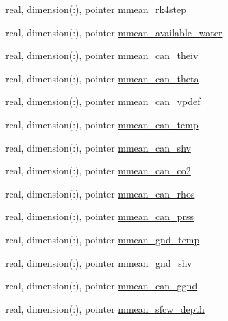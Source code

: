 \begin{DoxyCompactItemize}
\item 
real, dimension(\+:), pointer \hyperlink{structed__state__vars_1_1sitetype_a88b33141ab6bae2635ac1c1b04ba665d}{mmean\+\_\+rk4step}
\item 
real, dimension(\+:), pointer \hyperlink{structed__state__vars_1_1sitetype_a47f00c897787ef821e5ea31faf3558bf}{mmean\+\_\+available\+\_\+water}
\item 
real, dimension(\+:), pointer \hyperlink{structed__state__vars_1_1sitetype_a49199a78f099847a1e20b7688f785c0a}{mmean\+\_\+can\+\_\+theiv}
\item 
real, dimension(\+:), pointer \hyperlink{structed__state__vars_1_1sitetype_a5d27344c45b473150abbfaeda312c136}{mmean\+\_\+can\+\_\+theta}
\item 
real, dimension(\+:), pointer \hyperlink{structed__state__vars_1_1sitetype_a37181ec5e92d5e673eeccca0a0d5a1fe}{mmean\+\_\+can\+\_\+vpdef}
\item 
real, dimension(\+:), pointer \hyperlink{structed__state__vars_1_1sitetype_ae09588871695eb599013a6755dc76222}{mmean\+\_\+can\+\_\+temp}
\item 
real, dimension(\+:), pointer \hyperlink{structed__state__vars_1_1sitetype_a4ae91e06cdefd7814c0fe0f81be3abc9}{mmean\+\_\+can\+\_\+shv}
\item 
real, dimension(\+:), pointer \hyperlink{structed__state__vars_1_1sitetype_a4e4e75a5b4df5883cea8a60b971c1d67}{mmean\+\_\+can\+\_\+co2}
\item 
real, dimension(\+:), pointer \hyperlink{structed__state__vars_1_1sitetype_a004a28fe3261652b66512ad685618359}{mmean\+\_\+can\+\_\+rhos}
\item 
real, dimension(\+:), pointer \hyperlink{structed__state__vars_1_1sitetype_a66034af963cad77eb37dad9820d119d5}{mmean\+\_\+can\+\_\+prss}
\item 
real, dimension(\+:), pointer \hyperlink{structed__state__vars_1_1sitetype_a4aa7b8df00e42a7c7e4c5cb11631b979}{mmean\+\_\+gnd\+\_\+temp}
\item 
real, dimension(\+:), pointer \hyperlink{structed__state__vars_1_1sitetype_aea74a67679bfd36a6065f0d5d9390ad9}{mmean\+\_\+gnd\+\_\+shv}
\item 
real, dimension(\+:), pointer \hyperlink{structed__state__vars_1_1sitetype_ae37844c7440775306a5ba87bade4da8f}{mmean\+\_\+can\+\_\+ggnd}
\item 
real, dimension(\+:), pointer \hyperlink{structed__state__vars_1_1sitetype_aeab71f70d8c1317719df9f9659864738}{mmean\+\_\+sfcw\+\_\+depth}
\item 

\end{DoxyCompactItemize}
